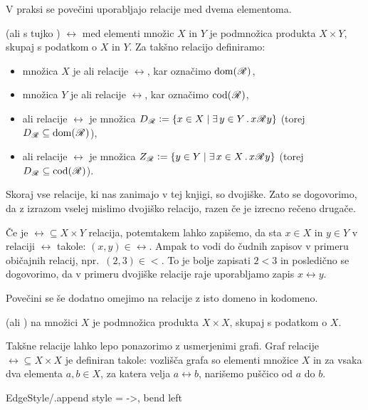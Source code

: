 		V praksi se povečini uporabljajo relacije med dvema elementoma.
		\begin{definicija}
			 (ali s tujko )  $\rel$ med elementi množic $X$ in $Y$ je podmnožica produkta $X \times Y$, skupaj s podatkom o $X$ in $Y$. Za takšno relacijo definiramo:
			\begin{itemize}
				\item
					množica $X$ je  ali  relacije $\rel$, kar označimo $\mathrm{dom}(\:\!{\mathscr{R}}\:\!)$,
				\item
					množica $Y$ je  ali  relacije $\rel$, kar označimo $\mathrm{cod}(\:\!{\mathscr{R}}\:\!)$,
				\item
					 ali  relacije $\rel$ je množica $\dd{\rel} \dfeq \set{x \in X}{\xsome{y}[Y]{x \rel y}}$ (torej $D_{\:\!{\mathscr{R}}\:\!} \subseteq \mathrm{dom}(\:\!{\mathscr{R}}\:\!)$),
				\item
					 ali  relacije $\rel$ je množica $\rn{\rel} \dfeq \set{y \in Y}{\xsome{x}[X]{x \rel y}}$ (torej $D_{\:\!{\mathscr{R}}\:\!} \subseteq \mathrm{cod}(\:\!{\mathscr{R}}\:\!)$).
			\end{itemize}
		\end{definicija}
		
		Skoraj vse relacije, ki nas zanimajo v tej knjigi, so dvojiške. Zato se dogovorimo, da z izrazom  vselej mislimo dvojiško relacijo, razen če je izrecno rečeno drugače.
		
		Če je $\rel \subseteq X \times Y$ relacija, potemtakem lahko zapišemo, da sta $x \in X$ in $y \in Y$ v relaciji $\rel$ takole: $(x, y) \in \rel$. Ampak to vodi do čudnih zapisov v primeru običajnih relacij, npr.~$(2, 3) \in <$. To je bolje zapisati $2 < 3$ in posledično se dogovorimo, da v primeru dvojiške relacije raje uporabljamo zapis $x \rel y$.
		
		Povečini se še dodatno omejimo na relacije z isto domeno in kodomeno.
		\begin{definicija}
			 (ali )  na množici $X$ je podmnožica produkta $X \times X$, skupaj s podatkom o $X$.
		\end{definicija}
		
		Takšne relacije lahko lepo ponazorimo z usmerjenimi grafi. Graf relacije $\rel \subseteq X \times X$ je definiran takole: vozlišča grafa so elementi množice $X$ in za vsaka dva elementa $a, b \in X$, za katera velja $a \rel b$, narišemo puščico od $a$ do $b$.
		
		\GraphInit[vstyle = Normal]
		\tikzset
		{
			EdgeStyle/.append style = {->, bend left}
		}
		
